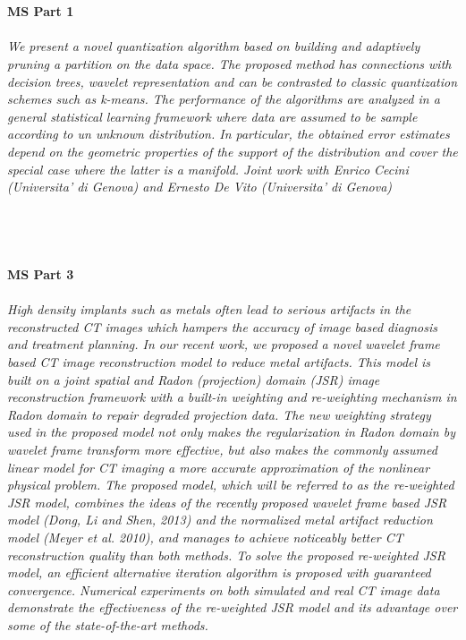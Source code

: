 \begin{multicols}{2}
    \\\\
    \noindent\textbf{MS Part 1}\\
\\  
    \textit{We present a novel quantization algorithm based on building and adaptively pruning a partition on the data space. The proposed method has connections with decision trees, wavelet representation and can be contrasted to classic quantization schemes such as k-means.  The performance of the algorithms are analyzed in a general statistical learning framework where data are assumed to be sample according to un unknown distribution. In particular, the obtained error estimates depend on the geometric properties of the support of the distribution and cover the special case where the latter is a manifold. Joint work with Enrico Cecini  (Universita’ di Genova) and Ernesto De Vito  (Universita’ di Genova)}\\
\\ 
    \\
    \\\\
    \noindent\textbf{MS Part 3}\\
\\  
    \textit{High density implants such as metals often lead to serious artifacts in the reconstructed CT images which hampers the accuracy of image based diagnosis and treatment planning. In our recent work, we proposed a novel wavelet frame based CT image reconstruction model to reduce metal artifacts. This model is built on a joint spatial and Radon (projection) domain (JSR) image reconstruction framework with a built-in weighting and re-weighting mechanism in Radon domain to repair degraded projection data. The new weighting strategy used in the proposed model not only makes the regularization in Radon domain by wavelet frame transform more effective, but also makes the commonly assumed linear model for CT imaging a more accurate approximation of the nonlinear physical problem. The proposed model, which will be referred to as the re-weighted JSR model, combines the ideas of the recently proposed wavelet frame based JSR model (Dong, Li and Shen, 2013) and the normalized metal artifact reduction model (Meyer et al. 2010), and manages to achieve noticeably better CT reconstruction quality than both methods. To solve the proposed re-weighted JSR model, an efficient alternative iteration algorithm is proposed with guaranteed convergence. Numerical experiments on both simulated and real CT image data demonstrate the effectiveness of the re-weighted JSR model and its advantage over some of the state-of-the-art methods.}\\

\end{multicols}
